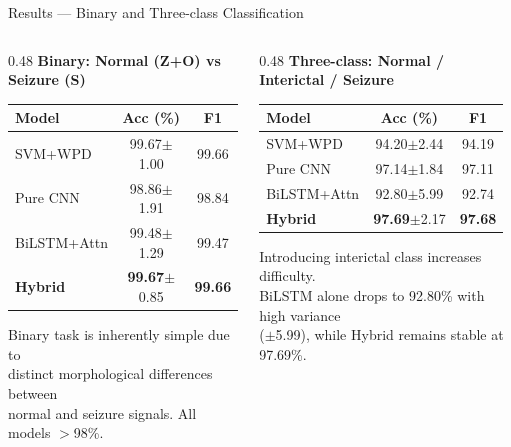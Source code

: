 \documentclass[aspectratio=169,12pt]{beamer}
\begin{document}
\begin{frame}[shrink=3]{Results --- Binary and Three-class Classification}
\begin{columns}[T]
\begin{column}{0.48\textwidth}
\centering
\textbf{Binary: Normal (Z+O) vs Seizure (S)}\\[0.15cm]
\small
\begin{tabular}{lcc}
\toprule
\textbf{Model} & \textbf{Acc (\%)} & \textbf{F1}\\
\midrule
SVM+WPD & 99.67\scriptsize{$\pm$1.00} & 99.66\\
Pure CNN & 98.86\scriptsize{$\pm$1.91} & 98.84\\
BiLSTM+Attn & 99.48\scriptsize{$\pm$1.29} & 99.47\\
\textbf{Hybrid} & \textbf{99.67}\scriptsize{$\pm$0.85} & \textbf{99.66}\\
\bottomrule
\end{tabular}
\vspace{0.15cm}

{\scriptsize Binary task is inherently simple due to\\distinct morphological differences between\\normal and seizure signals. All models $>$98\%.}
\end{column}
\begin{column}{0.48\textwidth}
\centering
\textbf{Three-class: Normal / Interictal / Seizure}\\[0.15cm]
\small
\begin{tabular}{lcc}
\toprule
\textbf{Model} & \textbf{Acc (\%)} & \textbf{F1}\\
\midrule
SVM+WPD & 94.20\scriptsize{$\pm$2.44} & 94.19\\
Pure CNN & 97.14\scriptsize{$\pm$1.84} & 97.11\\
BiLSTM+Attn & 92.80\scriptsize{$\pm$5.99} & 92.74\\
\textbf{Hybrid} & \textbf{97.69}\scriptsize{$\pm$2.17} & \textbf{97.68}\\
\bottomrule
\end{tabular}
\vspace{0.15cm}

{\scriptsize Introducing interictal class increases difficulty.\\BiLSTM alone drops to 92.80\% with high variance\\($\pm$5.99), while Hybrid remains stable at 97.69\%.}
\end{column}
\end{columns}
\end{frame}
\end{document}

